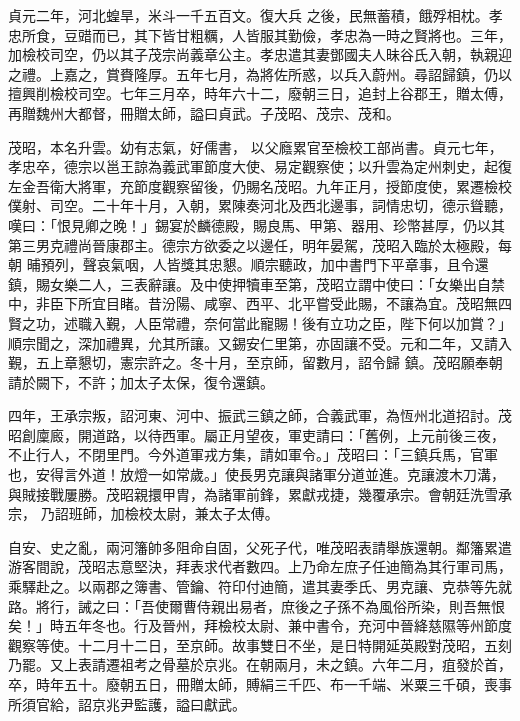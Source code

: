\begin{pinyinscope}
 貞元二年，河北蝗旱，米斗一千五百文。復大兵
 之後，民無蓄積，餓殍相枕。孝忠所食，豆䜺而已，其下皆甘粗糲，人皆服其勤儉，孝忠為一時之賢將也。三年，加檢校司空，仍以其子茂宗尚義章公主。孝忠遣其妻鄧國夫人昧谷氏入朝，執親迎之禮。上嘉之，賞賚隆厚。五年七月，為將佐所惑，以兵入蔚州。尋詔歸鎮，仍以擅興削檢校司空。七年三月卒，時年六十二，廢朝三日，追封上谷郡王，贈太傅，再贈魏州大都督，冊贈太師，謚曰貞武。子茂昭、茂宗、茂和。



 茂昭，本名升雲。幼有志氣，好儒書，
 以父廕累官至檢校工部尚書。貞元七年，孝忠卒，德宗以邕王諒為義武軍節度大使、易定觀察使；以升雲為定州刺史，起復左金吾衛大將軍，充節度觀察留後，仍賜名茂昭。九年正月，授節度使，累遷檢校僕射、司空。二十年十月，入朝，累陳奏河北及西北邊事，詞情忠切，德示聳聽，嘆曰：「恨見卿之晚！」錫宴於麟德殿，賜良馬、甲第、器用、珍幣甚厚，仍以其第三男克禮尚晉康郡主。德宗方欲委之以邊任，明年晏駕，茂昭入臨於太極殿，每朝
 晡預列，聲哀氣咽，人皆獎其忠懇。順宗聽政，加中書門下平章事，且令還鎮，賜女樂二人，三表辭讓。及中使押犢車至第，茂昭立謂中使曰：「女樂出自禁中，非臣下所宜目睹。昔汾陽、咸寧、西平、北平嘗受此賜，不讓為宜。茂昭無四賢之功，述職入覲，人臣常禮，奈何當此寵賜！後有立功之臣，陛下何以加賞？」順宗聞之，深加禮異，允其所讓。又錫安仁里第，亦固讓不受。元和二年，又請入覲，五上章懇切，憲宗許之。冬十月，至京師，留數月，詔令歸
 鎮。茂昭願奉朝請於闕下，不許；加太子太保，復令還鎮。



 四年，王承宗叛，詔河東、河中、振武三鎮之師，合義武軍，為恆州北道招討。茂昭創廩廄，開道路，以待西軍。屬正月望夜，軍吏請曰：「舊例，上元前後三夜，不止行人，不閉里門。今外道軍戎方集，請如軍令。」茂昭曰：「三鎮兵馬，官軍也，安得言外道！放燈一如常歲。」使長男克讓與諸軍分道並進。克讓渡木刀溝，與賊接戰屢勝。茂昭親擐甲胄，為諸軍前鋒，累獻戎捷，幾覆承宗。會朝廷洗雪承宗，
 乃詔班師，加檢校太尉，兼太子太傅。



 自安、史之亂，兩河籓帥多阻命自固，父死子代，唯茂昭表請舉族還朝。鄰籓累遣游客間說，茂昭志意堅決，拜表求代者數四。上乃命左庶子任迪簡為其行軍司馬，乘驛赴之。以兩郡之簿書、管鑰、符印付迪簡，遣其妻季氏、男克讓、克恭等先就路。將行，誡之曰：「吾使爾曹侍親出易者，庶後之子孫不為風俗所染，則吾無恨矣！」時五年冬也。行及晉州，拜檢校太尉、兼中書令，充河中晉絳慈隰等州節度
 觀察等使。十二月十二日，至京師。故事雙日不坐，是日特開延英殿對茂昭，五刻乃罷。又上表請遷祖考之骨墓於京兆。在朝兩月，未之鎮。六年二月，疽發於首，卒，時年五十。廢朝五日，冊贈太師，賻絹三千匹、布一千端、米粟三千碩，喪事所須官給，詔京兆尹監護，謚曰獻武。




\end{pinyinscope}

